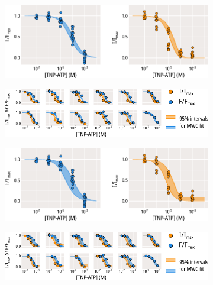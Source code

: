 \begin{figure}[h]
	\centering
	\begin{subfigure}[t]{0.45\textwidth}
		\caption{}\label{ch4fig:w311_mwc_fit_1}
		\centering
		\includegraphics[width=\textwidth]{w311_mwc_fit_1.pdf}
	\end{subfigure}
	\hfill
	\begin{subfigure}[t]{0.45\textwidth}
		\caption{}\label{ch4fig:w311_mwc_fit_2}
		\centering
		\includegraphics[width=\textwidth]{w311_mwc_fit_2.pdf}
	\end{subfigure}
	\vfill
	\begin{subfigure}[t]{0.45\textwidth}
		\caption{}\label{ch4fig:w311_single_fit_1}
		\centering
		\includegraphics[width=\textwidth]{w311_single_fit_1.pdf}
	\end{subfigure}
	\hfill
	\begin{subfigure}[t]{0.45\textwidth}
		\caption{}\label{ch4fig:w311_single_fit_2}
		\centering
		\includegraphics[width=\textwidth]{w311_single_fit_2.pdf}

\end{subfigure}
\end{figure}
